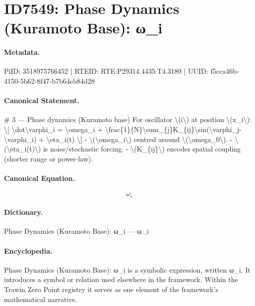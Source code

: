 \section*{ID7549: Phase Dynamics (Kuramoto Base): ω\_i}
\paragraph{Metadata.}
PiID: 3518975766452 | RTEID: RTE:P29314.4435:T4.3189 | UUID: f5cca46b-4150-5b62-8f47-b7b64eb84d28

\paragraph{Canonical Statement.}
\# 3 — Phase dynamics (Kuramoto base) For oscillator \textbackslash{}(i\textbackslash{}) at position \textbackslash{}(x\_i\textbackslash{}): \textbackslash{}[ \textbackslash{}dot\textbackslash{}varphi\_i = \textbackslash{}omega\_i + \textbackslash{}frac\{1\}\{N\}\textbackslash{}sum\_\{j\}K\_\{ij\}\textbackslash{}sin(\textbackslash{}varphi\_j-\textbackslash{}varphi\_i) + \textbackslash{}eta\_i(t) \textbackslash{}] - \textbackslash{}(\textbackslash{}omega\_i\textbackslash{}) centred around \textbackslash{}(\textbackslash{}omega\_0\textbackslash{}). - \textbackslash{}(\textbackslash{}eta\_i(t)\textbackslash{}) is noise/stochastic forcing. - \textbackslash{}(K\_\{ij\}\textbackslash{}) encodes spatial coupling (shorter range or power-law).

\paragraph{Canonical Equation.}
\[
\omega_i
\]

\paragraph{Dictionary.}
Phase Dynamics (Kuramoto Base): ω\_i — ω\_i

\paragraph{Encyclopedia.}
Phase Dynamics (Kuramoto Base): ω\_i is a symbolic expression, written ω\_i. It introduces a symbol or relation used elsewhere in the framework. Within the Trawin Zero Point registry it serves as one element of the framework's mathematical narrative.
